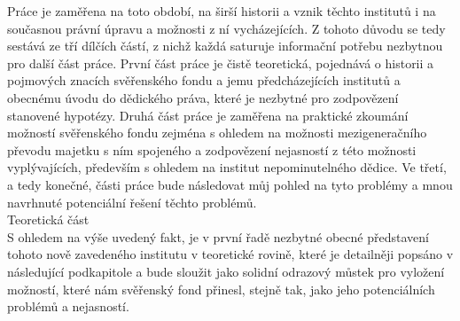 \documentclass{article}
\begin{document}
\indent Práce je zaměřena na toto období, na širší historii a vznik těchto institutů i na současnou právní úpravu a možnosti z ní vycházejících. Z tohoto důvodu se tedy sestává ze tří dílčích částí, z nichž každá saturuje informační potřebu nezbytnou pro další část práce. První část práce je čistě teoretická, pojednává o historii a pojmových znacích svěřenského fondu a jemu předcházejících institutů a obecnému úvodu do dědického práva, které je nezbytné pro zodpovězení stanovené hypotézy. Druhá část práce je zaměřena na praktické zkou\-mání možností svěřenského fondu zejména s ohledem na možnosti mezigeneračního převodu majetku s ním spojeného a zodpovězení nejasností z této možnosti vyplývajících, především s ohledem na institut nepominutelného dědice. Ve třetí, a tedy konečné, části práce bude následovat můj pohled na tyto problémy a mnou navrhnuté potenciální řešení těchto problémů. \\



{\Large Teoretická část}\\

S ohledem na výše uvedený fakt, je v první řadě nezbytné obecné představení tohoto nově zavedeného institutu v teoretické rovině, které je detailněji popsáno v následující podkapitole a bude sloužit jako solidní odrazový můstek pro vylož\-ení možností, které nám svěřenský fond přinesl, stejně tak, jako jeho potenciálních problémů a nejasností. \\
\end{document}
